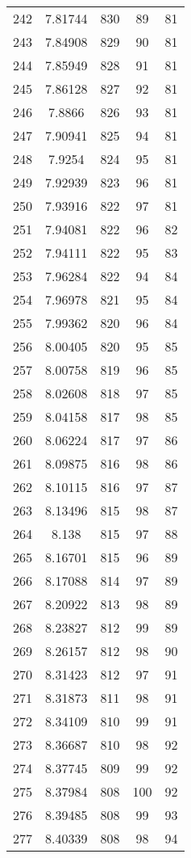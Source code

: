 \documentclass[12pt,a4paper]{article}
\begin{document}
\begin{tabular}{r|cccc}
	242 & 7.81744 & 830 & 89 & 81 \\
	243 & 7.84908 & 829 & 90 & 81 \\
	244 & 7.85949 & 828 & 91 & 81 \\
	245 & 7.86128 & 827 & 92 & 81 \\
	246 & 7.8866 & 826 & 93 & 81 \\
	247 & 7.90941 & 825 & 94 & 81 \\
	248 & 7.9254 & 824 & 95 & 81 \\
	249 & 7.92939 & 823 & 96 & 81 \\
	250 & 7.93916 & 822 & 97 & 81 \\
	251 & 7.94081 & 822 & 96 & 82 \\
	252 & 7.94111 & 822 & 95 & 83 \\
	253 & 7.96284 & 822 & 94 & 84 \\
	254 & 7.96978 & 821 & 95 & 84 \\
	255 & 7.99362 & 820 & 96 & 84 \\
	256 & 8.00405 & 820 & 95 & 85 \\
	257 & 8.00758 & 819 & 96 & 85 \\
	258 & 8.02608 & 818 & 97 & 85 \\
	259 & 8.04158 & 817 & 98 & 85 \\
	260 & 8.06224 & 817 & 97 & 86 \\
	261 & 8.09875 & 816 & 98 & 86 \\
	262 & 8.10115 & 816 & 97 & 87 \\
	263 & 8.13496 & 815 & 98 & 87 \\
	264 & 8.138 & 815 & 97 & 88 \\
	265 & 8.16701 & 815 & 96 & 89 \\
	266 & 8.17088 & 814 & 97 & 89 \\
	267 & 8.20922 & 813 & 98 & 89 \\
	268 & 8.23827 & 812 & 99 & 89 \\
	269 & 8.26157 & 812 & 98 & 90 \\
	270 & 8.31423 & 812 & 97 & 91 \\
	271 & 8.31873 & 811 & 98 & 91 \\
	272 & 8.34109 & 810 & 99 & 91 \\
	273 & 8.36687 & 810 & 98 & 92 \\
	274 & 8.37745 & 809 & 99 & 92 \\
	275 & 8.37984 & 808 & 100 & 92 \\
	276 & 8.39485 & 808 & 99 & 93 \\
	277 & 8.40339 & 808 & 98 & 94 \\

\end{tabular}
\end{document}
